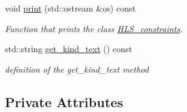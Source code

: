 \begin{DoxyCompactItemize}
void \hyperlink{classHLS__constraints_a5d60dce734c42d7f7a659195b5883044}{print} (std\+::ostream \&os) const
\begin{DoxyCompactList}\small\item\em Function that prints the class \hyperlink{classHLS__constraints}{H\+L\+S\+\_\+constraints}. \end{DoxyCompactList}\item 
std\+::string \hyperlink{classHLS__constraints_a48f7cc80f45d781e815dfc6e86c238ea}{get\+\_\+kind\+\_\+text} () const
\begin{DoxyCompactList}\small\item\em definition of the get\+\_\+kind\+\_\+text method \end{DoxyCompactList}\end{DoxyCompactItemize}
\subsection*{Private Attributes}
